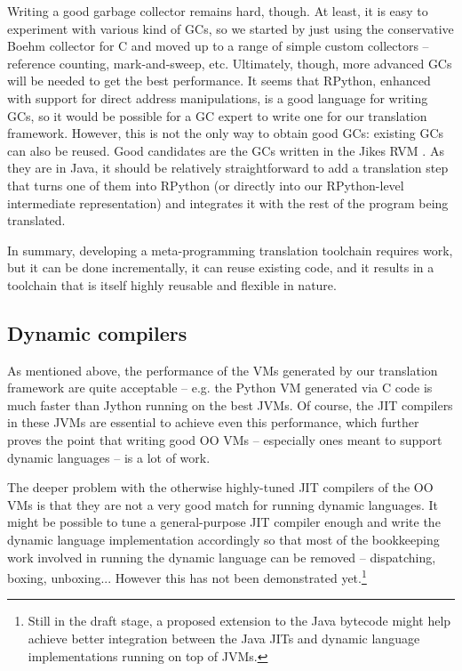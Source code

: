 \documentclass{llncs}
\begin{document}
Writing a good garbage collector remains hard, though.  At least, it is
easy to experiment with various kind of GCs, so we started by just using
the conservative Boehm \cite{Boehm} collector for C and moved up to a
range of simple custom collectors -- reference counting, mark-and-sweep,
etc.  Ultimately, though, more advanced GCs will be needed to get the
best performance.  It seems that RPython, enhanced with support for
direct address manipulations, is a good language for writing GCs, so it
would be possible for a GC expert to write one for our translation
framework.  However, this is not the only way to obtain good GCs:
existing GCs can also be reused.  Good candidates are the GCs written in
the Jikes RVM \cite{JikesGC}.  As they are in Java, it should be
relatively straightforward to add a translation step that turns one of
them into RPython (or directly into our RPython-level intermediate
representation) and integrates it with the rest of the program being
translated.

In summary, developing a meta-programming translation toolchain requires
work, but it can be done incrementally, it can reuse existing code, and
it results in a toolchain that is itself highly reusable and flexible in
nature.

\subsection{Dynamic compilers}
\label{subsect:dynamic_compilers}

As mentioned above, the performance of the VMs generated by our
translation framework are quite acceptable -- e.g. the Python VM
generated via C code is much faster than Jython running on the best
JVMs.  Of course, the JIT compilers in these JVMs are essential to
achieve even this performance, which further proves the point that
writing good OO VMs -- especially ones meant to support dynamic
languages -- is a lot of work.

The deeper problem with the otherwise highly-tuned JIT compilers of the
OO VMs is that they are not a very good match for running dynamic
languages.  It might be possible to tune a general-purpose JIT compiler
enough and write the dynamic language implementation accordingly so
that most of the bookkeeping work involved in running the dynamic
language can be removed -- dispatching, boxing, unboxing...  However
this has not been demonstrated yet.\footnote
{Still in the draft stage, a proposed
extension to the Java bytecode \cite{invokedynamic} might help achieve
better integration between the Java JITs and dynamic language
implementations running on top of JVMs.}
\end{document}

